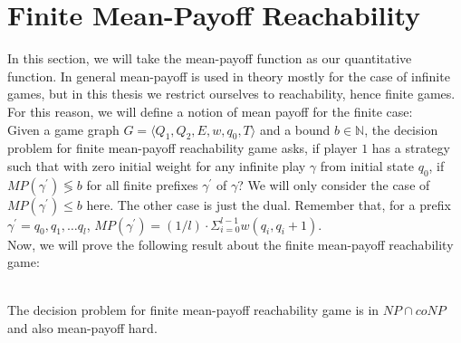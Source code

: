 \section{Finite Mean-Payoff Reachability}
In this section, we will take the mean-payoff function as our quantitative function. In general mean-payoff is used in theory mostly for the case of infinite games, but in this thesis we restrict ourselves to reachability, hence finite games. For this reason, we will define a notion of mean payoff for the finite case:\\
\vskip 0.5cm
Given a game graph $G=\langle Q_1, Q_2, E, w, q_0,T\rangle$ and a bound $b \in \mathbb{N}$, the decision problem for finite mean-payoff reachability game asks, if player $1$ has a strategy such that with zero initial weight for any infinite play $\gamma$ from initial state $q_0$, if $MP(\gamma^{\prime}) \lessgtr b$ for all finite prefixes $\gamma^{\prime}$ of $\gamma$? We will only consider the case of  $MP(\gamma^{\prime}) \leq b$ here. The other case is just the dual. Remember that, for a prefix $\gamma^{\prime}= q_0,q_1,\ldots q_l$, $MP(\gamma^{\prime})= (1/l) \cdot \Sigma_{i=0}^{l-1} w(q_i,q_i+1)$.\\ Now, we will prove the following result about the finite mean-payoff reachability game:\\
\\
\begin{theorem}
\label{fin-meanpayoff-thm}
The decision problem for finite mean-payoff reachability game is in $NP \cap coNP$ and also mean-payoff hard. 
\end{theorem}
